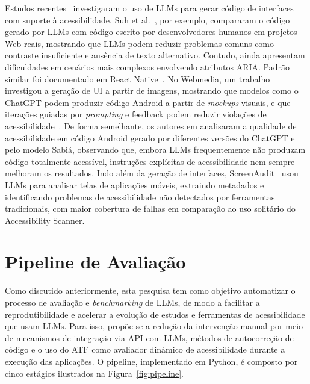 \documentclass[sigconf,anonymous,review]{webmedia}
\begin{document}
Estudos recentes~\citep{anonref1, xavier2025image, suh2025human} investigaram o uso de LLMs para gerar código de interfaces com suporte à acessibilidade. Suh et al.~\cite{suh2025human}, por exemplo, compararam o código gerado por LLMs com código escrito por desenvolvedores humanos em projetos Web reais, mostrando que LLMs podem reduzir problemas comuns como contraste insuficiente e ausência de texto alternativo. Contudo, ainda apresentam dificuldades em cenários mais complexos envolvendo atributos ARIA. Padrão similar foi documentado em React Native~\cite{anonref3}. No Webmedia, um trabalho investigou a geração de UI a partir de imagens, mostrando que modelos como o ChatGPT podem produzir código Android a partir de \textit{mockups} visuais, e que iterações guiadas por \textit{prompting} e feedback podem reduzir violações de acessibilidade~\citep{xavier2025image}. De forma semelhante, os autores em \cite{anonref1} analisaram a qualidade de acessibilidade em código Android gerado por diferentes versões do ChatGPT e pelo modelo Sabiá, observando que, embora LLMs frequentemente não produzam código totalmente acessível, instruções explícitas de acessibilidade nem sempre melhoram os resultados. Indo além da geração de interfaces, ScreenAudit~\citep{Zhong2025screenaudit} usou LLMs para analisar telas de aplicações móveis, extraindo metadados e identificando problemas de acessibilidade não detectados por ferramentas tradicionais, com maior cobertura de falhas em comparação ao uso solitário do Accessibility Scanner. 


\section{Pipeline de Avaliação}
\label{sec:pipeline}

Como discutido anteriormente, esta pesquisa tem como objetivo automatizar o processo de avaliação e \textit{benchmarking} de LLMs, de modo a facilitar a reprodutibilidade e acelerar a evolução de estudos e ferramentas de acessibilidade que usam LLMs. Para isso, propõe-se a redução da intervenção manual por meio de mecanismos de integração via API com LLMs, métodos de autocorreção de código e o uso do ATF como avaliador dinâmico de acessibilidade durante a execução das aplicações. O pipeline, implementado em Python, é composto por cinco estágios ilustrados na Figura~\ref{fig:pipeline}.
\end{document}
